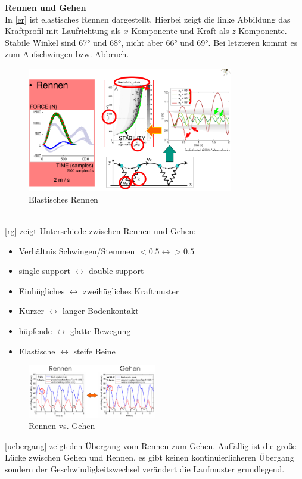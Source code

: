 \noindent
\textbf{Rennen und Gehen}\\
In \autoref{er} ist elastisches Rennen dargestellt. Hierbei zeigt die linke Abbildung das Kraftprofil mit Laufrichtung als $x$-Komponente und Kraft als $z$-Komponente. Stabile Winkel sind 67° und 68°, nicht aber 66° und 69°. Bei letzteren kommt es zum Aufschwingen bzw. Abbruch.
\begin{figure}[h!]
	\centering
	\includegraphics[width=0.8\textwidth]{figures/ch06_rennen.png}
	\caption{Elastisches Rennen}
	\label{er}
\end{figure}\\
\autoref{rg} zeigt Unterschiede zwischen Rennen und Gehen:
\begin{itemize}
\item Verhältnis Schwingen/Stemmen $<0.5 \leftrightarrow >0.5$
\item single-support $\leftrightarrow$ double-support
\item Einhügliches $\leftrightarrow$ zweihügliches Kraftmuster
\item Kurzer $\leftrightarrow$ langer Bodenkontakt
\item hüpfende $\leftrightarrow$ glatte Bewegung
\item Elastische $\leftrightarrow$ steife Beine
\end{itemize}
\begin{figure}[h!]
	\centering
	\includegraphics[width=0.5\textwidth]{figures/ch06_uebergang1.png}
	\caption{Rennen vs. Gehen}
	\label{rg}
\end{figure}
\noindent
\autoref{uebergang} zeigt den Übergang vom Rennen zum Gehen. Auffällig ist die große Lücke zwischen Gehen und Rennen, es gibt keinen kontinuierlicheren Übergang sondern der Geschwindigkeitswechsel verändert die Laufmuster grundlegend.
